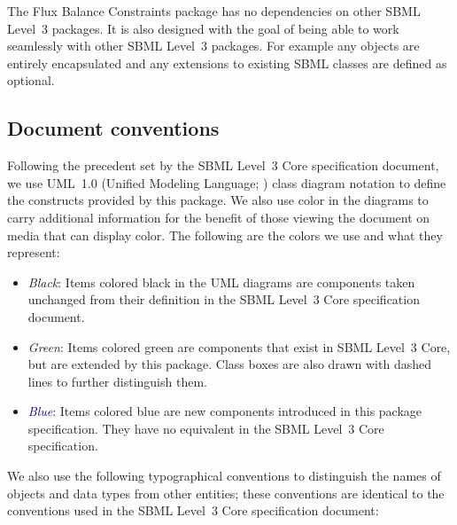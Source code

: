 The Flux Balance Constraints package has no dependencies on other
SBML Level~3 packages.  It is also designed with the goal of being able
to work seamlessly with other SBML Level~3 packages. For example any objects are entirely encapsulated and any extensions to existing SBML classes are defined as optional.

\subsection{Document conventions}
\label{conventions}

Following the precedent set by the SBML Level~3 Core specification
document, we use UML~1.0 (Unified Modeling Language;
\citealt{eriksson:1998,oestereich:1999}) class diagram notation to
define the constructs provided by this package.  We also use color in
the diagrams to carry additional information for the benefit of those
viewing the document on media that can display color.  The following are
the colors we use and what they represent:

\begin{itemize}

\item[\raisebox{2.75pt}{\colorbox{black}{\rule{0.8pt}{0.8pt}}}]
  \emph{Black}: Items colored black in the UML diagrams are components
  taken unchanged from their definition in the SBML Level~3 Core
  specification document.

\item[\raisebox{2.75pt}{\colorbox{mediumgreen}{\rule{0.8pt}{0.8pt}}}]
  \emph{\textcolor{mediumgreen}{Green}}: Items colored green are
  components that exist in SBML Level~3 Core, but are extended by this
  package.  Class boxes are also drawn with dashed lines to further
  distinguish them.

\item[\raisebox{2.75pt}{\colorbox{darkblue}{\rule{0.8pt}{0.8pt}}}]
  \emph{\textcolor{darkblue}{Blue}}: Items colored blue are new
  components introduced in this package specification.  They have no
  equivalent in the SBML Level~3 Core specification.

\end{itemize}

We also use the following typographical conventions to distinguish the
names of objects and data types from other entities; these conventions
are identical to the conventions used in the SBML Level~3 Core specification
document:


